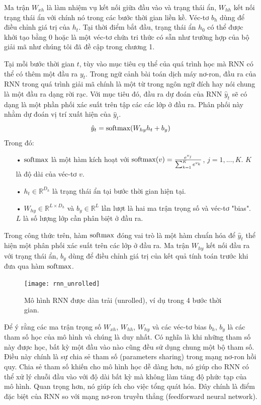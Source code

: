 Ma trận $W_{xh}$ là làm nhiệm vụ kết nối giữa đầu vào và trạng thái ẩn, $W_{hh}$ kết nối trạng thái ẩn với chính nó trong các bước thời gian liền kề. Véc-tơ $b_h$ dùng để điều chỉnh giá trị của $h_t$. Tại thời điểm bắt đầu, trạng thái ẩn $h_0$ có thể được khởi tạo bằng 0 hoặc là một véc-tơ chứa tri thức có sẵn như trường hợp của bộ giải mã như chúng tôi đã đề cập trong chương 1.

Tại mỗi bước thời gian $t$, tùy vào mục tiêu cụ thể của quá trình học mà RNN có thể có thêm một đầu ra $y_t$. Trong ngữ cảnh bài toán dịch máy nơ-ron, đầu ra của RNN trong quá trình giải mã chính là một từ trong ngôn ngữ đích hay nói chung là một đầu ra dạng rời rạc. Với mục tiêu đó, đầu ra dự đoán của RNN $\hat{y}_t$ sẽ có dạng là một phần phối xác suất trên tập các các lớp ở đầu ra. Phân phối này nhằm dự đoán vị trí xuất hiện của $\hat{y}_t$.
\begin{equation} \label{rnnOuputSoftmaxDistribution}
	\hat{y}_t = \mathrm{softmax}(W_{hy}h_t + b_y)
\end{equation}
Trong đó:
\begin{itemize}
	\item[•] $\mathrm{softmax}$ là một hàm kích hoạt với $\mathrm{softmax}(v) = \frac{e^{v_j}}{\sum_{k=1}^{K}e^{v_k}}$, $j = 1,...,K$. $K$ là độ dài của véc-tơ $v$.
	\item[•] $h_{t} \in \mathbb{R}^{D_h}$ là trạng thái ẩn tại bước thời gian hiện tại.
	\item[•] $W_{hy} \in \mathbb{R}^{L \times D_h}$ và $b_y \in \mathbb{R}^L$ lần lượt là hai ma trận trọng số và véc-tơ "bias". $L$ là số lượng lớp cần phân biệt ở đầu ra.
\end{itemize}

Trong công thức trên, hàm $\mathrm{softmax}$ đóng vai trò là một hàm chuẩn hóa để $\hat{y}_t$ thể hiện một phân phối xác suất trên các lớp ở đầu ra. Ma trận $W_{hy}$ kết nối đầu ra với trạng thái ẩn, $b_y$ dùng để điều chỉnh giá trị của kết quả tính toán trước khi đưa qua hàm $\mathrm{softmax}$.

\begin{figure}
	\centering
	\texttt{[image: rnn\_unrolled]}
	\caption[Mô hình RNN dạng dàn trải]{Mô hình RNN được dàn trải (unrolled), ví dụ trong 4 bước thời gian.}
	\label{fig_rnn_unrolled}
\end{figure}

Để ý rằng các ma trận trọng số $W_{xh}$, $W_{hh}$, $W_{hy}$ và các véc-tơ bias $b_h$, $b_y$ là các tham số học của mô hình và chúng là duy nhất. Có nghĩa là khi những tham số này được học, bất kỳ một đầu vào nào cũng đều sử dụng chung một bộ tham số. Điều này chính là sự chia sẻ tham số (parameters sharing) trong mạng nơ-ron hồi quy. Chia sẻ tham số khiến cho mô hình học dễ dàng hơn, nó giúp cho RNN có thể xử lý chuỗi đầu vào với độ dài bất kỳ mà không làm tăng độ phức tạp của mô hình. Quan trọng hơn, nó giúp ích cho việc tổng quát hóa. Đây chính là điểm đặc biệt của RNN so với mạng nơ-ron truyền thẳng (feedforward neural network).

